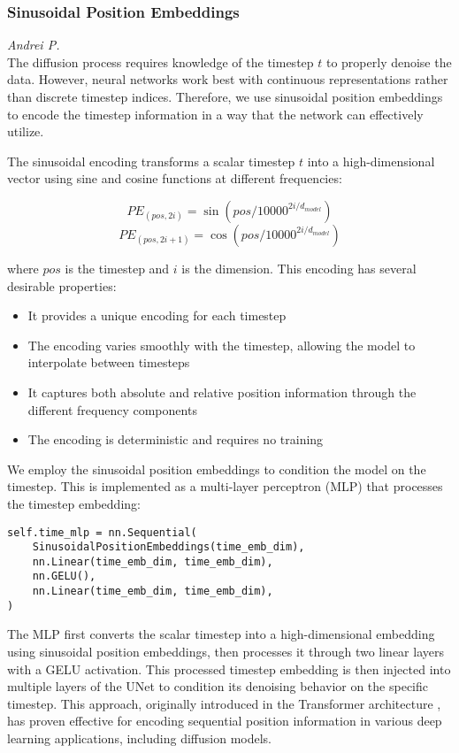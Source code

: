 \subsubsection{Sinusoidal Position Embeddings}
\textit{Andrei P.}\\
The diffusion process requires knowledge of the timestep $t$ to properly denoise the data. However, neural networks work best with continuous representations rather than discrete timestep indices. Therefore, we use sinusoidal position embeddings to encode the timestep information in a way that the network can effectively utilize.

The sinusoidal encoding transforms a scalar timestep $t$ into a high-dimensional vector using sine and cosine functions at different frequencies:

\begin{equation}
    PE_{(pos,2i)} = \sin(pos/10000^{2i/d_{model}})
\end{equation}
\begin{equation}
    PE_{(pos,2i+1)} = \cos(pos/10000^{2i/d_{model}})
\end{equation}

\noindent where $pos$ is the timestep and $i$ is the dimension. This encoding has several desirable properties:

\begin{itemize}
    \item It provides a unique encoding for each timestep
    \item The encoding varies smoothly with the timestep, allowing the model to interpolate between timesteps
    \item It captures both absolute and relative position information through the different frequency components
    \item The encoding is deterministic and requires no training
\end{itemize}


\noindent We employ the sinusoidal position embeddings to condition the model on the timestep. This is implemented as a multi-layer perceptron (MLP) that processes the timestep embedding:

\begin{lstlisting}[basicstyle=\tiny]
self.time_mlp = nn.Sequential(
    SinusoidalPositionEmbeddings(time_emb_dim),
    nn.Linear(time_emb_dim, time_emb_dim),
    nn.GELU(),
    nn.Linear(time_emb_dim, time_emb_dim),
)
\end{lstlisting}

\noindent The MLP first converts the scalar timestep into a high-dimensional embedding using sinusoidal position embeddings, then processes it through two linear layers with a GELU activation. This processed timestep embedding is then injected into multiple layers of the UNet to condition its denoising behavior on the specific timestep. This approach, originally introduced in the Transformer architecture \cite{vaswani2017attention}, has proven effective for encoding sequential position information in various deep learning applications, including diffusion models.


